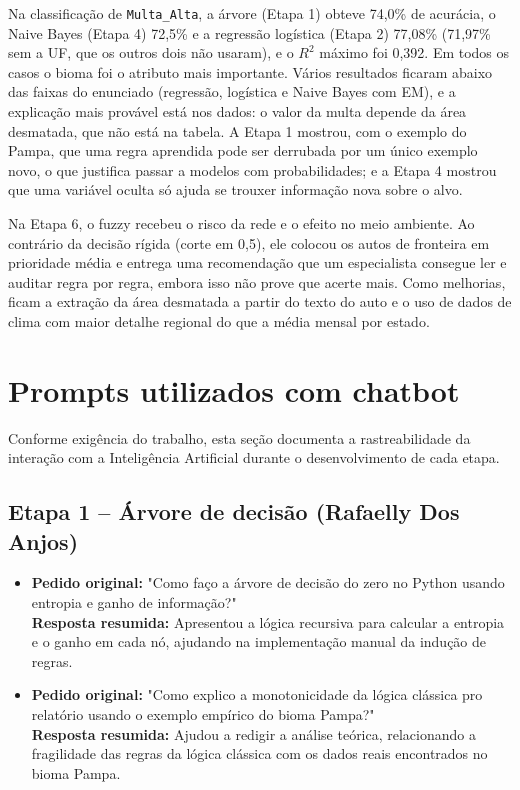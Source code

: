 \documentclass[11pt]{article}
\begin{document}
Na classificação de \texttt{Multa\_Alta}, a árvore (Etapa 1) obteve 74,0\% de acurácia, o Naive Bayes (Etapa 4) 72,5\% e a regressão logística (Etapa 2) 77,08\% (71,97\% sem a UF, que os outros dois não usaram), e o $R^2$ máximo foi 0,392. Em todos os casos o bioma foi o atributo mais importante. Vários resultados ficaram abaixo das faixas do enunciado (regressão, logística e Naive Bayes com EM), e a explicação mais provável está nos dados: o valor da multa depende da área desmatada, que não está na tabela. A Etapa 1 mostrou, com o exemplo do Pampa, que uma regra aprendida pode ser derrubada por um único exemplo novo, o que justifica passar a modelos com probabilidades; e a Etapa 4 mostrou que uma variável oculta só ajuda se trouxer informação nova sobre o alvo.

Na Etapa 6, o fuzzy recebeu o risco da rede e o efeito no meio ambiente. Ao contrário da decisão rígida (corte em 0,5), ele colocou os autos de fronteira em prioridade média e entrega uma recomendação que um especialista consegue ler e auditar regra por regra, embora isso não prove que acerte mais. Como melhorias, ficam a extração da área desmatada a partir do texto do auto e o uso de dados de clima com maior detalhe regional do que a média mensal por estado.



\nocite{russell2020}

\appendix
\section{Prompts utilizados com chatbot}
Conforme exigência do trabalho, esta seção documenta a rastreabilidade da interação com a Inteligência Artificial durante o desenvolvimento de cada etapa.

\subsection*{Etapa 1 -- Árvore de decisão (Rafaelly Dos Anjos)}
\begin{itemize}
    \item \textbf{Pedido original:} "Como faço a árvore de decisão do zero no Python usando entropia e ganho de informação?" \\
    \textbf{Resposta resumida:} Apresentou a lógica recursiva para calcular a entropia e o ganho em cada nó, ajudando na implementação manual da indução de regras.
    
    \item \textbf{Pedido original:} "Como explico a monotonicidade da lógica clássica pro relatório usando o exemplo empírico do bioma Pampa?" \\
    \textbf{Resposta resumida:} Ajudou a redigir a análise teórica, relacionando a fragilidade das regras da lógica clássica com os dados reais encontrados no bioma Pampa.
\end{itemize}
\end{document}
